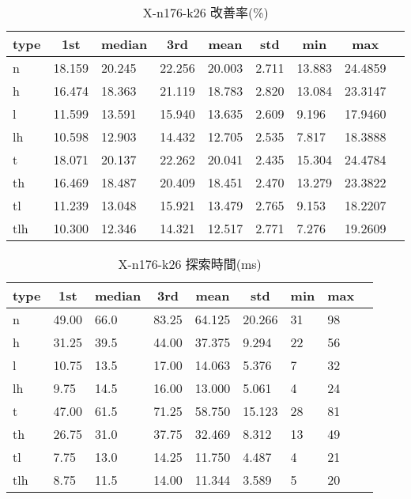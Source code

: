 \begin{table}[htbp]
    \caption{X-n176-k26 改善率(\%)}
    \begin{tabular}{|l|l|l|l|l|l|l|l|l|}\hline
    \multicolumn{1}{|c|}{\textbf{type}}
    &\multicolumn{1}{|c|}{\textbf{1st}}
    &\multicolumn{1}{c|}{\textbf{median}}
    &\multicolumn{1}{c|}{\textbf{3rd}}
    &\multicolumn{1}{c|}{\textbf{mean}}
    &\multicolumn{1}{c|}{\textbf{std}}
    &\multicolumn{1}{c|}{\textbf{min}}
    &\multicolumn{1}{c|}{\textbf{max}}\\\hline
	n & 18.159 & 20.245 & 22.256 & 20.003 & 2.711 & 13.883 & 24.4859\\\hline
	h & 16.474 & 18.363 & 21.119 & 18.783 & 2.820 & 13.084 & 23.3147\\\hline
	l & 11.599 & 13.591 & 15.940 & 13.635 & 2.609 & 9.196 & 17.9460\\\hline
	lh & 10.598 & 12.903 & 14.432 & 12.705 & 2.535 & 7.817 & 18.3888\\\hline
	t & 18.071 & 20.137 & 22.262 & 20.041 & 2.435 & 15.304 & 24.4784\\\hline
	th & 16.469 & 18.487 & 20.409 & 18.451 & 2.470 & 13.279 & 23.3822\\\hline
	tl & 11.239 & 13.048 & 15.921 & 13.479 & 2.765 & 9.153 & 18.2207\\\hline
	tlh & 10.300 & 12.346 & 14.321 & 12.517 & 2.771 & 7.276 & 19.2609\\\hline
	\end{tabular}
\end{table}
\begin{table}[htbp]
    \caption{X-n176-k26 探索時間(ms)}
    \begin{tabular}{|l|l|l|l|l|l|l|l|l|}\hline
    \multicolumn{1}{|c|}{\textbf{type}}
    &\multicolumn{1}{|c|}{\textbf{1st}}
    &\multicolumn{1}{c|}{\textbf{median}}
    &\multicolumn{1}{c|}{\textbf{3rd}}
    &\multicolumn{1}{c|}{\textbf{mean}}
    &\multicolumn{1}{c|}{\textbf{std}}
    &\multicolumn{1}{c|}{\textbf{min}}
    &\multicolumn{1}{c|}{\textbf{max}}\\\hline
	n & 49.00 & 66.0 & 83.25 & 64.125 & 20.266 & 31 & 98\\\hline
	h & 31.25 & 39.5 & 44.00 & 37.375 & 9.294 & 22 & 56\\\hline
	l & 10.75 & 13.5 & 17.00 & 14.063 & 5.376 & 7 & 32\\\hline
	lh & 9.75 & 14.5 & 16.00 & 13.000 & 5.061 & 4 & 24\\\hline
	t & 47.00 & 61.5 & 71.25 & 58.750 & 15.123 & 28 & 81\\\hline
	th & 26.75 & 31.0 & 37.75 & 32.469 & 8.312 & 13 & 49\\\hline
	tl & 7.75 & 13.0 & 14.25 & 11.750 & 4.487 & 4 & 21\\\hline
	tlh & 8.75 & 11.5 & 14.00 & 11.344 & 3.589 & 5 & 20\\\hline
	\end{tabular}
\end{table}
